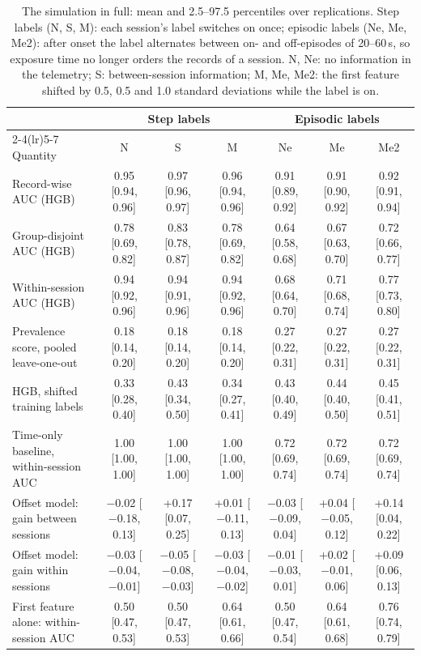 \begin{table}[ht]
\centering
\scriptsize
\caption{The simulation in full: mean and 2.5--97.5 percentiles over  replications. Step labels (N, S, M): each session's label switches on once; episodic labels (Ne, Me, Me2): after onset the label alternates between on- and off-episodes of 20--60\,s, so exposure time no longer orders the records of a session. N, Ne: no information in the telemetry; S: between-session information; M, Me, Me2: the first feature shifted by 0.5, 0.5 and 1.0 standard deviations while the label is on.}
\label{tab:supp_sim}
\setlength{\tabcolsep}{2pt}
\begin{tabular}{@{}lcccccc@{}}
\toprule
 & \multicolumn{3}{c}{Step labels} & \multicolumn{3}{c}{Episodic labels} \\
\cmidrule(lr){2-4}\cmidrule(lr){5-7}
Quantity & N & S & M & Ne & Me & Me2 \\
\midrule
Record-wise AUC (HGB) & 0.95 {\tiny [0.94, 0.96]} & 0.97 {\tiny [0.96, 0.97]} & 0.96 {\tiny [0.94, 0.96]} & 0.91 {\tiny [0.89, 0.92]} & 0.91 {\tiny [0.90, 0.92]} & 0.92 {\tiny [0.91, 0.94]} \\
Group-disjoint AUC (HGB) & 0.78 {\tiny [0.69, 0.82]} & 0.83 {\tiny [0.78, 0.87]} & 0.78 {\tiny [0.69, 0.82]} & 0.64 {\tiny [0.58, 0.68]} & 0.67 {\tiny [0.63, 0.70]} & 0.72 {\tiny [0.66, 0.77]} \\
Within-session AUC (HGB) & 0.94 {\tiny [0.92, 0.96]} & 0.94 {\tiny [0.91, 0.96]} & 0.94 {\tiny [0.92, 0.96]} & 0.68 {\tiny [0.64, 0.70]} & 0.71 {\tiny [0.68, 0.74]} & 0.77 {\tiny [0.73, 0.80]} \\
Prevalence score, pooled leave-one-out & 0.18 {\tiny [0.14, 0.20]} & 0.18 {\tiny [0.14, 0.20]} & 0.18 {\tiny [0.14, 0.20]} & 0.27 {\tiny [0.22, 0.31]} & 0.27 {\tiny [0.22, 0.31]} & 0.27 {\tiny [0.22, 0.31]} \\
HGB, shifted training labels & 0.33 {\tiny [0.28, 0.40]} & 0.43 {\tiny [0.34, 0.50]} & 0.34 {\tiny [0.27, 0.41]} & 0.43 {\tiny [0.40, 0.49]} & 0.44 {\tiny [0.40, 0.50]} & 0.45 {\tiny [0.41, 0.51]} \\
Time-only baseline, within-session AUC & 1.00 {\tiny [1.00, 1.00]} & 1.00 {\tiny [1.00, 1.00]} & 1.00 {\tiny [1.00, 1.00]} & 0.72 {\tiny [0.69, 0.74]} & 0.72 {\tiny [0.69, 0.74]} & 0.72 {\tiny [0.69, 0.74]} \\
Offset model: gain between sessions & $-$0.02 {\tiny [$-$0.18, 0.13]} & +0.17 {\tiny [0.07, 0.25]} & +0.01 {\tiny [$-$0.11, 0.13]} & $-$0.03 {\tiny [$-$0.09, 0.04]} & +0.04 {\tiny [$-$0.05, 0.12]} & +0.14 {\tiny [0.04, 0.22]} \\
Offset model: gain within sessions & $-$0.03 {\tiny [$-$0.04, $-$0.01]} & $-$0.05 {\tiny [$-$0.08, $-$0.03]} & $-$0.03 {\tiny [$-$0.04, $-$0.02]} & $-$0.01 {\tiny [$-$0.03, 0.01]} & +0.02 {\tiny [$-$0.01, 0.06]} & +0.09 {\tiny [0.06, 0.13]} \\
First feature alone: within-session AUC & 0.50 {\tiny [0.47, 0.53]} & 0.50 {\tiny [0.47, 0.53]} & 0.64 {\tiny [0.61, 0.66]} & 0.50 {\tiny [0.47, 0.54]} & 0.64 {\tiny [0.61, 0.68]} & 0.76 {\tiny [0.74, 0.79]} \\
\bottomrule
\end{tabular}
\end{table}